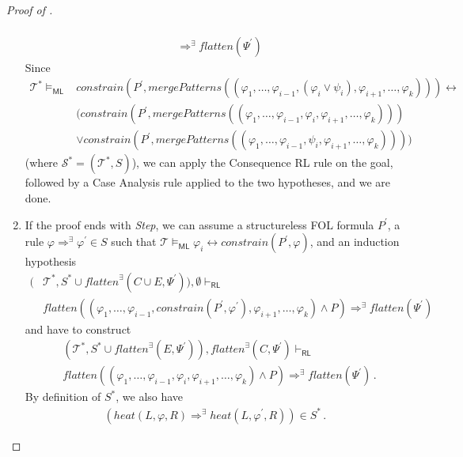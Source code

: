 \documentclass{article}
\newcommand{\RL}{\mathsf{RL}}
\newcommand{\ML}{\mathsf{ML}}
\begin{document}
\begin{proof}[Proof of ]
\begin{enumerate}
\begin{align*}
            \\ & \Rightarrow^\exists
            \mathit{flatten}(\Psi^\prime)
        \end{align*}
        Since
        \begin{align*}
            \mathcal{T}^* \vDash_\ML & \mathit{constrain}(P^\prime, \mathit{mergePatterns}((\varphi_1, \ldots, \varphi_{i-1}, (\varphi_i \lor \psi_i), \varphi_{i+1}, \ldots, \varphi_k))) \leftrightarrow \\
            & (\mathit{constrain}(P^\prime, \mathit{mergePatterns}((\varphi_1, \ldots, \varphi_{i-1}, \varphi_i, \varphi_{i+1}, \ldots, \varphi_k))) \\
            & \lor \mathit{constrain}(P^\prime, \mathit{mergePatterns}((\varphi_1, \ldots, \varphi_{i-1}, \psi_i, \varphi_{i+1}, \ldots, \varphi_k))))
        \end{align*}
        (where $\mathcal{S}^* = (\mathcal{T}^*, S)$),
        we can apply the Consequence RL rule on the goal, followed by a Case Analysis rule applied to the two hypotheses, and we are done.
        
    \item If the proof ends with \emph{Step},
      we can assume a structureless FOL formula $P^\prime$, a rule $\varphi \Rightarrow^\exists \varphi^\prime \in S$ such that
      $\mathcal{T} \vDash_\ML \varphi_i \leftrightarrow \mathit{constrain}(P^\prime, \varphi)$,
      and an induction hypothesis
      \begin{align*}
        (&\mathcal{T}^*, S^* \cup \mathit{flatten}^\exists(C \cup E, \Psi^\prime)), \emptyset \vdash_\RL
          \\ &
          \mathit{flatten}((\varphi_1, \ldots, \varphi_{i-1}, \mathit{constrain}(P^\prime, \varphi^\prime), \varphi_{i+1}, \ldots, \varphi_k) \land P) \Rightarrow^\exists \mathit{flatten}(\Psi^\prime)     
      \end{align*}
      and have to construct
      \begin{align*}
      & (\mathcal{T}^*, S^* \cup \mathit{flatten}^\exists(E, \Psi^\prime)), \mathit{flatten}^\exists(C, \Psi^\prime) \vdash_\RL \\
          & \mathit{flatten}((\varphi_1, \ldots, \varphi_{i-1}, \varphi_i, \varphi_{i+1}, \ldots, \varphi_k) \land P) \Rightarrow^\exists \mathit{flatten}(\Psi^\prime)    \, .
      \end{align*}
        By definition of $S^*$, we also have
        \begin{align*}
            (\mathit{heat}(L, \varphi, R) \Rightarrow^\exists \mathit{heat}(L, \varphi^\prime, R)) \in S^* \, .
        \end{align*}
      

\end{enumerate}
\end{proof}
\end{document}
